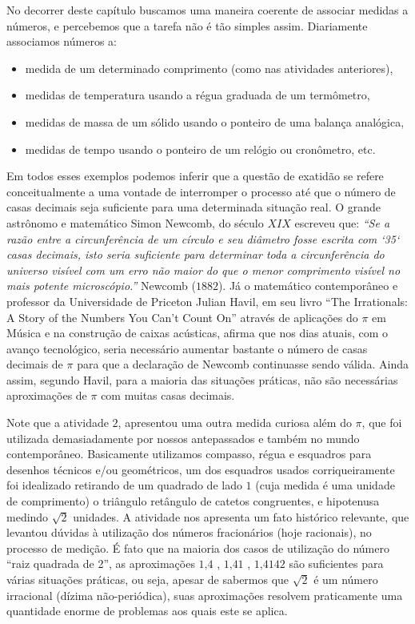 \label{\detokenize{NO103-5:organizando-ideias-medicao-e-exatidao}}
No decorrer deste capítulo buscamos uma maneira coerente de associar medidas a números, e percebemos que a tarefa não é tão simples assim. Diariamente associamos números a:
\begin{itemize}
\item {} 
medida de um determinado comprimento (como nas atividades anteriores),

\item {} 
medidas de temperatura usando a régua graduada de um termômetro,

\item {} 
medidas de massa de um sólido usando o ponteiro de uma balança analógica,

\item {} 
medidas de tempo usando o ponteiro de um relógio ou cronômetro, etc.

\end{itemize}

Em todos esses exemplos podemos inferir que a questão de exatidão se refere conceitualmente a uma vontade de interromper o processo até que o número de casas decimais seja suficiente para uma determinada situação real. O grande astrônomo e matemático Simon Newcomb, do século $XIX$ escreveu que:  \emph{“Se a razão entre a circunferência de um círculo e seu diâmetro fosse escrita com {}`35{}` casas decimais, isto seria suficiente para determinar toda a circunferência do universo visível com um erro não maior do que o menor comprimento visível no mais potente microscópio.”} Newcomb ($1882$). Já o matemático contemporâneo e professor da Universidade de Priceton Julian Havil, em seu livro “The Irrationals: A Story of the Numbers You Can’t Count On” através de aplicações do $\pi$ em Música e na construção de caixas acústicas, afirma que nos dias atuais, com o avanço tecnológico, seria necessário aumentar bastante o número de casas decimais de $\pi$ para que a declaração de Newcomb continuasse sendo válida. Ainda assim, segundo Havil, para a maioria das situações práticas, não são necessárias aproximações de $\pi$ com muitas casas decimais.

Note que a atividade $2$, apresentou uma outra medida curiosa além do $\pi$, que foi utilizada demasiadamente por nossos antepassados e também no mundo contemporâneo. Basicamente utilizamos compasso, régua e esquadros para desenhos técnicos e/ou geométricos, um dos esquadros usados corriqueiramente foi idealizado retirando de um quadrado de lado $1$ (cuja medida é uma unidade de comprimento) o triângulo retângulo de catetos congruentes, e hipotenusa medindo $\sqrt{2}$ unidades. A atividade nos apresenta um fato histórico relevante, que levantou dúvidas à utilização dos números fracionários (hoje racionais), no processo de medição. É fato que na maioria dos casos de utilização do número “raiz quadrada de 2”, as aproximações $1\text{,}4$ , $1\text{,}41$ , $1\text{,}4142$ são suficientes para várias situações práticas, ou seja, apesar de sabermos que $\sqrt{2}$ é um número irracional (dízima não-periódica), suas aproximações resolvem praticamente uma quantidade enorme de problemas aos quais este se aplica.

